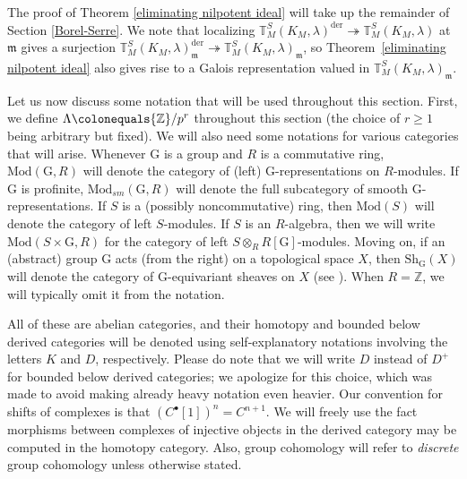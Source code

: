 \documentclass{amsart}
\theoremstyle{remark}
\numberwithin{equation}{subsection}
\newcommand{\Z}{\ZZ}
\newcommand{\ZZ}{{\mathbb Z}}
\newcommand{\mf}{\mathfrak}
\newcommand{\defeq}{\colonequals}
\renewcommand{\(}{\left(}
\renewcommand{\)}{\right)}
\begin{document}
\noindent The proof of Theorem \ref{eliminating nilpotent ideal} will take up the remainder of Section \ref{Borel-Serre}. We note that localizing $\mathbb{T}^S_{M}\left(K_M,\lambda\right)^{\mathrm{der}}\twoheadrightarrow \mathbb{T}^S_{M}\left(K_M,\lambda\right)$ at $\mf{m}$ gives a surjection $\mathbb{T}^S_{M}\left(K_M,\lambda\right)^{\mathrm{der}}_\mf{m}\twoheadrightarrow \mathbb{T}^S_{M}\left(K_M,\lambda\right)_\mf{m}$, so Theorem~\ref{eliminating nilpotent ideal} also gives rise to a Galois representation valued in $\mathbb{T}^S_{M}\left(K_M,\lambda\right)_\mf{m}$.

\medskip

Let us now discuss some notation that will be used throughout this section. First, we define $\Lambda \defeq \Z /p^r$ throughout this section (the choice of $r\geq 1$ being arbitrary but fixed). We will also need some notations for various categories that will arise. Whenever $\mathrm{G}$ is a group and $R$ is a commutative ring, $\mathrm{Mod}(\mathrm{G},R)$ will denote the category of (left) $\mathrm{G}$-representations on $R$-modules. If $\mathrm{G}$ is profinite, $\mathrm{Mod}_{sm}(\mathrm{G},R)$ will denote the full subcategory of smooth $\mathrm{G}$-representations. If $S$ is a (possibly noncommutative) ring, then $\mathrm{Mod}(S)$ will denote the category of left $S$-modules. If $S$ is an $R$-algebra, then we will write $\mathrm{Mod}(S \times \mathrm{G},R)$ for the category of left $S \otimes_R R[\mathrm{G}]$-modules. Moving on, if an (abstract) group $\mathrm{G}$ acts (from the right) on a topological space $X$, then $\mathrm{Sh}_{\mathrm{G}}(X)$ will denote the category of $\mathrm{G}$-equivariant sheaves on $X$ (see \cite[\S 2.3]{newton-thorne}). When $R=\Z$, we will typically omit it from the notation.

\medskip

All of these are abelian categories, and their homotopy and bounded below derived categories will be denoted using self-explanatory notations involving the letters $K$ and $D$, respectively. Please do note that we will write $D$ instead of $D^+$ for bounded below derived categories; we apologize for this choice, which was made to avoid making already heavy notation even heavier.
Our convention for shifts of complexes is that $(C^\bullet[1])^n = C^{n+1}$. We will freely use the fact morphisms between complexes of injective objects in the derived category may be computed in the homotopy category. Also, group cohomology will refer to \emph{discrete} group cohomology unless otherwise stated.
\end{document}
